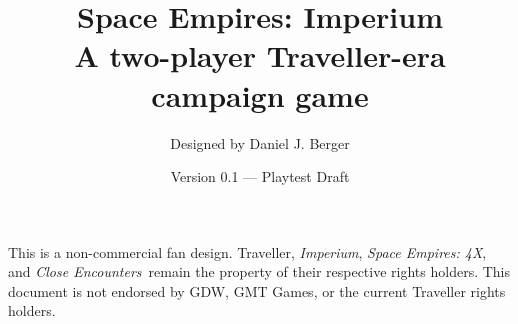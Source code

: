 \documentclass[letterpaper,11pt,twocolumn]{article}
\title{%
  Space Empires: Imperium \\
  \vspace{0.4em}
  \large A two-player Traveller-era campaign game}
\author{Designed by Daniel J. Berger}
\date{Version 0.1 --- Playtest Draft}
\newcommand{\Imperium}{\textit{Imperium}}
\newcommand{\SpaceEmpires}{\textit{Space Empires: 4X}}
\newcommand{\CloseEncounters}{\textit{Close Encounters}}
\begin{document}
  \maketitle
  \onecolumn
  \tableofcontents
  \vfill
  \begin{center}
    \small
    This is a non-commercial fan design. Traveller, \Imperium,
    \SpaceEmpires, and \CloseEncounters\ remain the property of their
    respective rights holders. This document is not endorsed by GDW, GMT
    Games, or the current Traveller rights holders.
  \end{center}
  \clearpage
  \twocolumn

  
  
  
  
  
  
  
  
  
  
  
  
  
  
  
\end{document}
